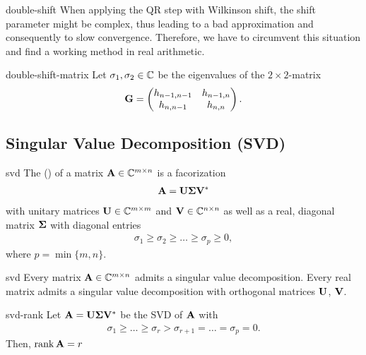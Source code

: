 \begin{intro}{double-shift}
  When applying the QR step with Wilkinson shift, the shift parameter
  might be complex, thus leading to a bad approximation and
  consequently to slow convergence. Therefore, we have to circumvent
  this situation and find a working method in real arithmetic. 
\end{intro}

\begin{Lemma}{double-shift-matrix}
  Let $\sigma_1,\sigma_2\in\mathbb C$ be the eigenvalues of the $2\times2$-matrix
  \begin{gather}
    \mathbf G =
    \begin{pmatrix}
      h_{n-1,n-1}&h_{n-1,n}\\h_{n,n-1}&h_{n,n}
    \end{pmatrix}.
  \end{gather}
\end{Lemma}

\subsection{Singular Value Decomposition (SVD)}

\begin{Definition}{svd}
  The  () of a matrix $\mathbf A\in\mathbb C^{m\times n}$ is a facorization
  \begin{gather}
    \mathbf A = \mathbf U\boldsymbol\Sigma\mathbf V^*
  \end{gather}
  with unitary matrices $\mathbf U\in\mathbb C^{m\times m}$ and $\mathbf V\in\mathbb C^{n\times n}$ as
  well as a real, diagonal matrix $\boldsymbol\Sigma$ with diagonal entries
  \begin{gather}
    \sigma_1 \ge \sigma_2 \ge \dots \ge \sigma_p \ge 0,
  \end{gather}
  where $p = \min\{m,n\}$.
\end{Definition}

\begin{Theorem}{svd}
  Every matrix $\mathbf A\in\mathbb C^{m\times n}$ admits a singular value
  decomposition. Every real matrix admits a singular value
  decomposition with orthogonal matrices $\mathbf U$, $\mathbf V$.
\end{Theorem}

\begin{Corollary}{svd-rank}
  Let $\mathbf A = \mathbf U\boldsymbol\Sigma\mathbf V^*$ be the SVD of $\mathbf A$ with
  \begin{gather}
    \sigma_1 \ge \dots \ge \sigma_r > \sigma_{r+1} = \dots = \sigma_p = 0.
  \end{gather}
  Then, $\operatorname{rank} \mathbf A = r$
\end{Corollary}

